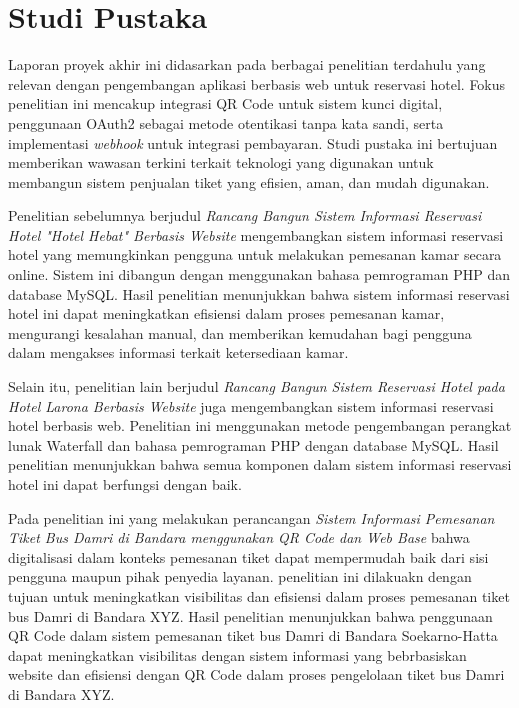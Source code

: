 \section{Studi Pustaka}

Laporan proyek akhir ini didasarkan pada berbagai penelitian terdahulu yang relevan dengan pengembangan aplikasi berbasis web untuk reservasi hotel. Fokus penelitian ini mencakup integrasi QR Code untuk sistem kunci digital, penggunaan OAuth2 sebagai metode otentikasi tanpa kata sandi, serta implementasi \textit{webhook} untuk integrasi pembayaran. Studi pustaka ini bertujuan memberikan wawasan terkini terkait teknologi yang digunakan untuk membangun sistem penjualan tiket yang efisien, aman, dan mudah digunakan.

Penelitian sebelumnya \cite{Allard_Voutama_2024} berjudul \textit{Rancang Bangun Sistem Informasi Reservasi Hotel "Hotel Hebat" Berbasis Website} mengembangkan sistem informasi reservasi hotel yang memungkinkan pengguna untuk melakukan pemesanan kamar secara online. Sistem ini dibangun dengan menggunakan bahasa pemrograman PHP dan database MySQL. Hasil penelitian menunjukkan bahwa sistem informasi reservasi hotel ini dapat meningkatkan efisiensi dalam proses pemesanan kamar, mengurangi kesalahan manual, dan memberikan kemudahan bagi pengguna dalam mengakses informasi terkait ketersediaan kamar.

Selain itu, penelitian lain \cite{Iskandar_Susilawati_Akramunnisa_2025} berjudul \textit{Rancang Bangun Sistem Reservasi Hotel pada Hotel Larona Berbasis Website} juga mengembangkan sistem informasi reservasi hotel berbasis web. Penelitian ini menggunakan metode pengembangan perangkat lunak Waterfall dan bahasa pemrograman PHP dengan database MySQL. Hasil penelitian menunjukkan bahwa semua komponen dalam sistem informasi reservasi hotel ini dapat berfungsi dengan baik.


Pada penelitian ini \cite{Wibowo2020} yang melakukan perancangan \textit{Sistem Informasi Pemesanan Tiket Bus Damri di Bandara menggunakan QR Code dan Web Base} bahwa digitalisasi dalam konteks pemesanan tiket dapat mempermudah baik dari sisi pengguna maupun pihak penyedia layanan. penelitian ini \cite{Wibowo2020} dilakuakn dengan tujuan untuk meningkatkan visibilitas dan efisiensi dalam proses pemesanan tiket bus Damri di Bandara XYZ. Hasil penelitian menunjukkan bahwa penggunaan QR Code dalam sistem pemesanan tiket bus Damri di Bandara Soekarno-Hatta dapat meningkatkan visibilitas dengan sistem informasi yang bebrbasiskan website dan efisiensi dengan QR Code dalam proses pengelolaan tiket bus Damri di Bandara XYZ.


